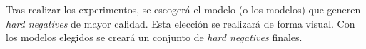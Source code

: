 Tras realizar los experimentos, se escogerá el modelo (o los modelos) que generen \textit{hard negatives} de mayor calidad. Esta elección se realizará de forma visual. Con los modelos elegidos se creará un conjunto de \textit{hard negatives} finales.
















